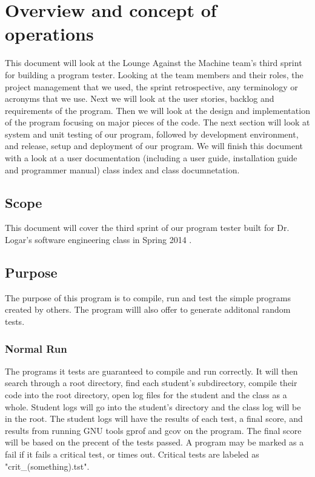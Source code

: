
\chapter{Overview and concept of operations}

This document will look at the Lounge Against the Machine team's third sprint for building
a program tester. Looking at the team members and their roles, the project
management that we used, the sprint retrospective, any terminology or acronyms
that we use. Next we will look at the user stories, backlog and requirements of the
program. Then we will look at the design and implementation of the program focusing
on major pieces of the code. The next section will look at system and unit testing of 
our program, followed by development environment, and release, setup and
deployment of our program. We will finish this document with a look at a user 
documentation (including a user guide, installation guide and programmer manual)
class index and class documnetation.


\section{Scope}
This document will cover the third sprint of our program tester built for Dr. Logar's
software engineering class in Spring 2014 .


\section{Purpose}
The purpose of this program is to compile, run and test the simple programs created by others. The program willl also offer to generate additonal random tests.

\subsection{Normal Run}
The programs it tests are guaranteed to compile and run correctly. It will then search through a root directory, find each student's
subdirectory, compile their code into the root directory, open log files for the student and the class as a whole. Student logs will
go into the student's directory and the class log will be in the root. The student logs will have the results of each test, a final
score, and results from running GNU tools gprof and gcov on the program. The final score will be based on the precent of the tests passed. A program may be marked as a fail if it fails a critical test, or times out. Critical tests are labeled as "crit\_(something).tst".

